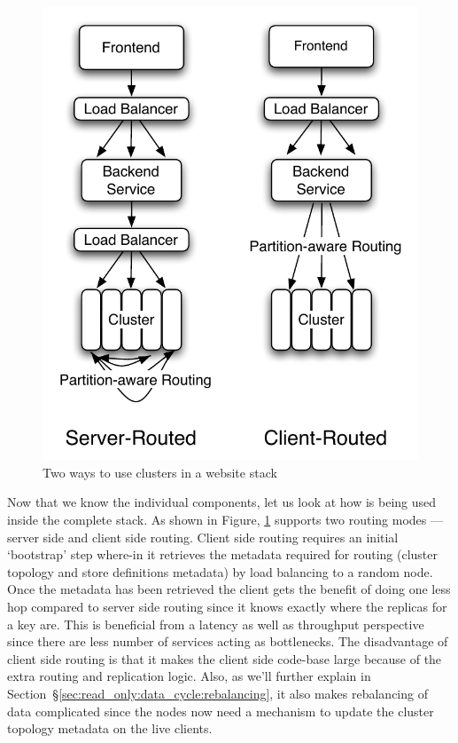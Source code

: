 \begin{figure}
  \centering
    \includegraphics[scale=0.45]{images/fullstack.pdf}
  \caption{Two ways to use \projectname{} clusters in a website stack}
  \label{fullstack}
\end{figure}


\noindent 
Now that we know the individual components, let us look at how \projectname{} is being used inside the complete \linkedin{} stack. As shown in Figure, \ref{fullstack} \projectname{} supports two routing modes --- server side and client side routing. Client side routing requires an initial `bootstrap' step where-in it retrieves the metadata required for routing (cluster topology and store definitions metadata) by load balancing to a random node. Once the metadata has been retrieved the client gets the benefit of doing one less hop compared to server side routing since it knows exactly where the replicas for a key are. This is beneficial from a latency as well as throughput perspective since there are less number of services acting as bottlenecks. The disadvantage of client side routing is that it makes the client side code-base large because of the extra routing and replication logic. Also, as we'll further explain in Section~\S\ref{sec:read_only:data_cycle:rebalancing}, it also makes rebalancing of data complicated since the \projectname{} nodes now need a mechanism to update the cluster topology metadata on the live clients. 


